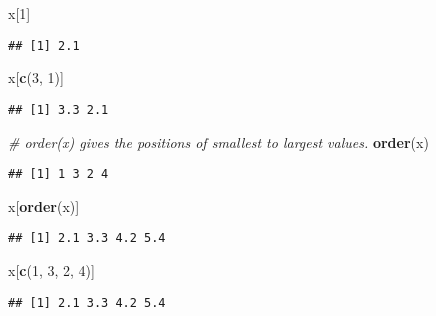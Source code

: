 \documentclass[
]{book}
\newenvironment{Shaded}{\begin{snugshade}}{\end{snugshade}}
\newcommand{\CommentTok}[1]{\textcolor[rgb]{0.56,0.35,0.01}{\textit{#1}}}
\newcommand{\DecValTok}[1]{\textcolor[rgb]{0.00,0.00,0.81}{#1}}
\newcommand{\KeywordTok}[1]{\textcolor[rgb]{0.13,0.29,0.53}{\textbf{#1}}}
\newcommand{\NormalTok}[1]{#1}
\begin{document}
\begin{Shaded}
\begin{Highlighting}[]
\NormalTok{x[}\DecValTok{1}\NormalTok{]}
\end{Highlighting}
\end{Shaded}

\begin{verbatim}
## [1] 2.1
\end{verbatim}

\begin{Shaded}
\begin{Highlighting}[]
\NormalTok{x[}\KeywordTok{c}\NormalTok{(}\DecValTok{3}\NormalTok{, }\DecValTok{1}\NormalTok{)]}
\end{Highlighting}
\end{Shaded}

\begin{verbatim}
## [1] 3.3 2.1
\end{verbatim}

\begin{Shaded}
\begin{Highlighting}[]
\CommentTok{\# \textasciigrave{}order(x)\textasciigrave{} gives the positions of smallest to largest values.}
\KeywordTok{order}\NormalTok{(x)}
\end{Highlighting}
\end{Shaded}

\begin{verbatim}
## [1] 1 3 2 4
\end{verbatim}

\begin{Shaded}
\begin{Highlighting}[]
\NormalTok{x[}\KeywordTok{order}\NormalTok{(x)]}
\end{Highlighting}
\end{Shaded}

\begin{verbatim}
## [1] 2.1 3.3 4.2 5.4
\end{verbatim}

\begin{Shaded}
\begin{Highlighting}[]
\NormalTok{x[}\KeywordTok{c}\NormalTok{(}\DecValTok{1}\NormalTok{, }\DecValTok{3}\NormalTok{, }\DecValTok{2}\NormalTok{, }\DecValTok{4}\NormalTok{)]}
\end{Highlighting}
\end{Shaded}

\begin{verbatim}
## [1] 2.1 3.3 4.2 5.4
\end{verbatim}
\end{document}
